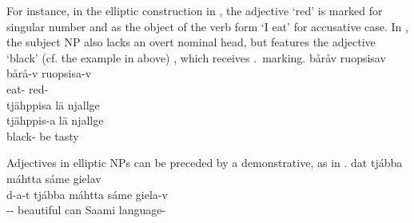 For instance, in the elliptic construction in , the adjective  ‘red’ %
is marked for singular number and as the object of the verb form  ‘I eat’ for accusative case. In , the subject NP also lacks an overt nominal head, but features the adjective  ‘black’ (cf. the example in  above)%
, which receives \NOMs.\PLs\ marking. 
\ea\label{adjNPheadEx1}
\glll	båråv ruopsisav\\
	bårå-v ruopsisa-v\\
	eat- red-\\\nopagebreak
{}	
\z
\ea\label{adjNPheadEx2}
\glll	tjähppisa lä njallge\\
	tjähppis-a lä njallge\\
	black- be\BS{} tasty\BS{}\\\nopagebreak
{}	
\z

Adjectives in elliptic NPs can be preceded by a demonstrative, %
as in . 
\vfill
\clearpage
\ea\label{adjNPheadEx3}
\glll	dat tjábba máhtta sáme gielav\\
	d-a-t tjábba máhtta sáme giela-v\\
	-- beautiful\BS{} can\BS{} Saami\BS{} language-\\\nopagebreak
{}	
\z

